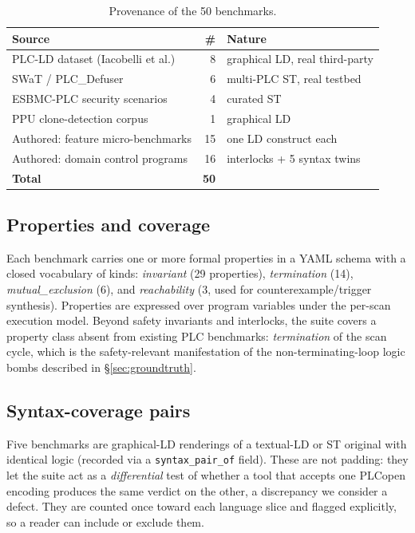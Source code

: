 \begin{table}[t]
  \centering\small
  \caption{Provenance of the 50 benchmarks.}
  \label{tab:provenance}
  \begin{tabular}{@{}lr l@{}}
    \toprule
    \textbf{Source} & \textbf{\#} & \textbf{Nature}\\
    \midrule
    PLC-LD dataset (Iacobelli et al.) & 8  & graphical LD, real third-party\\
    SWaT / PLC\_Defuser               & 6  & multi-PLC ST, real testbed\\
    ESBMC-PLC security scenarios      & 4  & curated ST\\
    PPU clone-detection corpus        & 1  & graphical LD\\
    Authored: feature micro-benchmarks& 15 & one LD construct each\\
    Authored: domain control programs & 16 & interlocks + 5 syntax twins\\
    \midrule
    \textbf{Total}                    & \textbf{50} & \\
    \bottomrule
  \end{tabular}
\end{table}

\subsection{Properties and coverage}
Each benchmark carries one or more formal properties in a YAML schema with a closed
vocabulary of kinds: \emph{invariant} (29 properties), \emph{termination}
(14), \emph{mutual\_exclusion} (6), and \emph{reachability} (3, used for
counterexample/trigger synthesis). Properties are expressed over program variables
under the per-scan execution model. Beyond safety invariants and interlocks, the suite
covers a property class absent from existing PLC benchmarks: \emph{termination} of the
scan cycle, which is the safety-relevant manifestation of the non-terminating-loop
logic bombs described in \S\ref{sec:groundtruth}.

\subsection{Syntax-coverage pairs}
Five benchmarks are graphical-LD renderings of a textual-LD or ST original with
identical logic (recorded via a \texttt{syntax\_pair\_of} field). These are not
padding: they let the suite act as a \emph{differential} test of whether a tool that
accepts one PLCopen encoding produces the same verdict on the other, a discrepancy we
consider a defect. They are counted once toward each language slice and flagged
explicitly, so a reader can include or exclude them.

